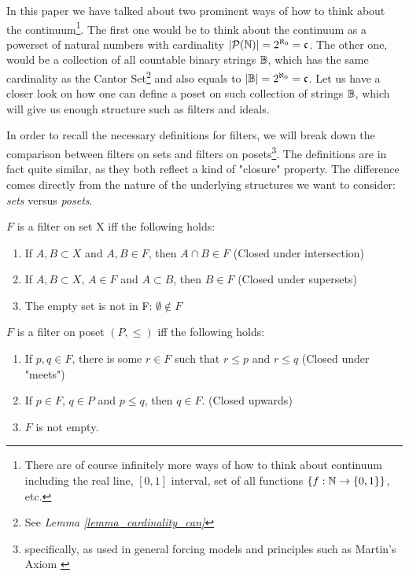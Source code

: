 In this paper we have talked about two prominent ways of how to think about the continuum\footnote{There are of course infinitely more ways of how to think about continuum including the real line, $[0,1]$ interval, set of all functions $\{ f: \mathbb{N} \to \{0,1\}\}$, etc.}. The first one would be to think about the continuum as a powerset of natural numbers with cardinality $|\mathcal{P}(\mathbb{N})| = 2^{\aleph_0} = \mathfrak{c}$. The other one, would be a collection of all countable binary strings $\mathbb{B}$, which has the same cardinality as the Cantor Set\footnote{See \textit{Lemma \ref{lemma_cardinality_can}}} and also equals to $|\mathbb{B}| = 2^{\aleph_0} = \mathfrak{c}$. Let us have a closer look on how one can define a poset on such collection of strings $\mathbb{B}$, which will give us enough structure such as filters and ideals.  


In order to recall the necessary definitions for filters, we will break down the comparison between filters on sets and filters on posets\footnote{specifically, as used in general forcing models and principles such as Martin's Axiom \cite{jech2003set}}. The definitions are in fact quite similar, as they both reflect a kind of "closure" property. The difference comes directly from the nature of the underlying structures we want to consider: \textit{sets} versus \textit{posets}.

\begin{definition}\label{def_filter_sets}
    $F$ is a filter on set X iff the following holds:
    \begin{enumerate}
        \item If $A, B \subset X$ and $A, B \in F$, then $A \cap B \in F$ (Closed under intersection)
        \item If $A, B \subset X$, $A \in F$ and $A \subset B$, then $B \in F$ (Closed under supersets)
        \item The empty set is not in F: $\emptyset \notin F$
    \end{enumerate}
\end{definition}


\begin{definition}\label{def_filter_posets}
    $F$ is a filter on poset $(P, \leq)$ iff the following holds:
    \begin{enumerate}
        \item If $p,q \in F$, there is some $r \in F$ such that $r \leq p$ and $r \leq q$ (Closed under "meets")
        \item If $p \in F$, $q \in P$ and $p \leq q$, then $q \in F$. (Closed upwards)
        \item $F$ is not empty.
    \end{enumerate}
\end{definition}

